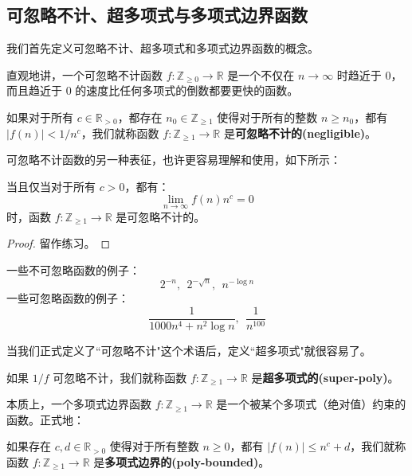 \subsection{可忽略不计、超多项式与多项式边界函数}

我们首先定义可忽略不计、超多项式和多项式边界函数的概念。

直观地讲，一个可忽略不计函数 $f:\mathbb{Z}_{\geq0}\to\mathbb{R}$ 是一个不仅在 $n\to\infty$ 时趋近于 $0$，而且趋近于 $0$ 的速度比任何多项式的倒数都要更快的函数。

\begin{definition}\label{def:2-5}
如果对于所有 $c\in\mathbb{R}_{>0}$，都存在 $n_0\in\mathbb{Z}_{\geq 1}$ 使得对于所有的整数 $n\geq n_0$，都有 $|f(n)|<{1}/{n^c}$，我们就称函数 $f:\mathbb{Z}_{\geq1}\to\mathbb{R}$ 是\textbf{可忽略不计的(negligible)}。
\end{definition}

可忽略不计函数的另一种表征，也许更容易理解和使用，如下所示：

\begin{theorem}
当且仅当对于所有 $c>0$，都有：
$$
\lim_{n\to\infty}f(n)n^c=0
$$
时，函数 $f:\mathbb{Z}_{\geq1}\to\mathbb{R}$ 是可忽略不计的。
\end{theorem}

\begin{proof}
留作练习。
\end{proof}

\begin{example}
一些不可忽略函数的例子：
$$
2^{-n},~~2^{-\sqrt{n}},~~n^{-\log n}
$$
一些可忽略函数的例子：
$$
\frac{1}{1000n^4+n^2\log n},~~\frac{1}{n^{100}}
$$
\end{example}

当我们正式定义了``可忽略不计"这个术语后，定义``超多项式"就很容易了。

\begin{definition}
如果 ${1}/{f}$ 可忽略不计，我们就称函数 $f:\mathbb{Z}_{\geq1}\to\mathbb{R}$ 是\textbf{超多项式的(super-poly)}。
\end{definition}

本质上，一个多项式边界函数 $f:\mathbb{Z}_{\geq1}\to\mathbb{R}$ 是一个被某个多项式（绝对值）约束的函数。正式地：

\begin{definition}
如果存在 $c,d\in\mathbb{R}_{>0}$ 使得对于所有整数 $n\geq0$，都有 $|f(n)|\leq n^c+d$，我们就称函数 $f:\mathbb{Z}_{\geq1}\to\mathbb{R}$ 是\textbf{多项式边界的(poly-bounded)}。
\end{definition}

